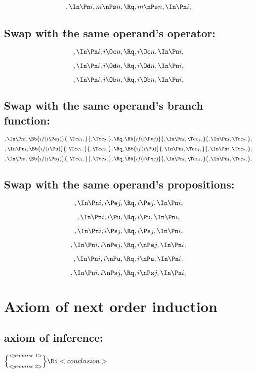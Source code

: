 \[,\In \Pn i, m \nPs n, \Rq , m \nPs n, \In \Pn i,\]


\bigskip
\bigskip
\subsection{Swap with the same operand's operator:}
\[,\In \Pn i, i \Oc n, \Rq , i \Oc n, \In \Pn i,\]

\[,\In \Pn i, i \Od n, \Rq , i \Od n, \In \Pn i,\]

\[,\In \Pn i, i \Ob n, \Rq , i \Ob n, \In \Pn i,\]

\bigskip
\bigskip
\subsection{Swap with the same operand's  branch function:}
\[,\In \Pn i, \Bb{if(i \Pe j)}{,\Tc c_1,}{,\Tc c_2,}, \Rq , \Bb{if(i \Pe j)}{,\In \Pn i, \Tc c_1,}{,\In \Pn i, \Tc c_2,},\]
\bigskip
\bigskip
\[,\In \Pn i, \Bb{if(i \Pu)}{,\Tc c_1,}{,\Tc c_2,}, \Rq , \Bb{if(i \Pu)}{,\In \Pn i, \Tc c_1,}{,\In \Pn i, \Tc c_2,},\]
\bigskip
\bigskip
\[,\In \Pn i, \Bb{if(i \Ps j)}{,\Tc c_1,}{,\Tc c_2,}, \Rq , \Bb{if(i \Ps j)}{,\In \Pn i, \Tc c_1,}{,\In \Pn i, \Tc c_2,},\]


\bigskip
\bigskip
\subsection{Swap with the same operand's propositions:}
\[,\In \Pn i, i \Pe j, \Rq , i \Pe j, \In \Pn i,\]

\[,\In \Pn i, i \Pu, \Rq , i \Pu, \In \Pn i,\]

\[,\In \Pn i, i \Ps j, \Rq , i \Ps j, \In \Pn i,\]

\[,\In \Pn i, i \nPe j, \Rq , i \nPe j, \In \Pn i,\]

\[,\In \Pn i, i \nPu, \Rq , i \nPu, \In \Pn i,\]

\[,\In \Pn i, i \nPs j, \Rq , i \nPs j, \In \Pn i,\]


\bigskip
\bigskip
\bigskip
\bigskip
\section{Axiom of next order induction}
\subsection{axiom of inference:}
\begin{math}
\Bigl\{ ^{<premise \; 1>}_{<premise \;  2>}\Bigl\} \Ri <conclusion>
\end{math}
\bigskip
\bigskip
